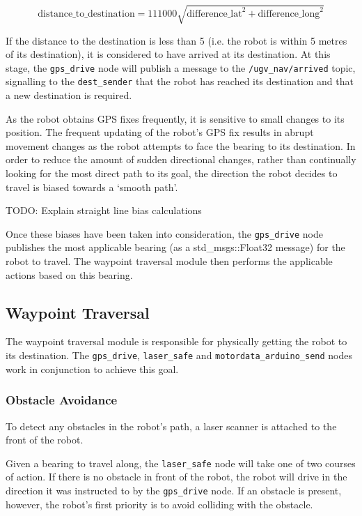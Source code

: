 \documentclass[titlepage,12pt,a4paper]{article}
\begin{document}
\pagebreak


\begin{equation}
	\text{distance\_to\_destination} = 111000\sqrt{\text{difference\_lat}^2+ \text{difference\_long}^2}
\end{equation}

If the distance to the destination is less than 5 (i.e. the robot is within 5 metres of its destination), it is considered to have arrived at its destination. At this stage, the \verb|gps_drive| node will publish a message to the \verb|/ugv_nav/arrived| topic, signalling to the \verb|dest_sender| that the robot has reached its destination and that a new destination is required.

As the robot obtains GPS fixes frequently, it is sensitive to small changes to its position. The frequent updating of the robot's GPS fix results in abrupt movement changes as the robot attempts to face the bearing to its destination. In order to reduce the amount of sudden directional changes, rather than continually looking for the most direct path to its goal, the direction the robot decides to travel is biased towards a `smooth path'.


TODO: Explain straight line bias calculations 


Once these biases have been taken into consideration, the \verb|gps_drive| node publishes the most applicable bearing (as a std\_msgs::Float32 message) for the robot to travel. The waypoint traversal module then performs the applicable actions based on this bearing.

\pagebreak

\subsection{Waypoint Traversal}
The waypoint traversal module is responsible for physically getting the robot to its destination. The \verb|gps_drive|, \verb|laser_safe| and \verb|motordata_arduino_send| nodes work in conjunction to achieve this goal.

\subsubsection{Obstacle Avoidance}
To detect any obstacles in the robot's path, a laser scanner is attached to the front of the robot.

Given a bearing to travel along, the \verb|laser_safe| node will take one of two courses of action. If there is no obstacle in front of the robot, the robot will drive in the direction it was instructed to by the \verb|gps_drive| node. If an obstacle is present, however, the robot's first priority is to avoid colliding with the obstacle. 
\end{document}
